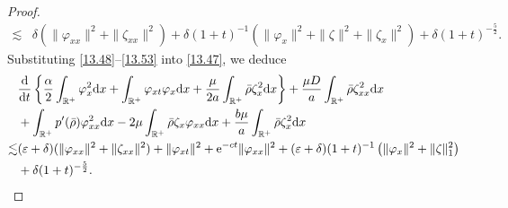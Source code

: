 \documentclass[11pt]{article}
\theoremstyle{plain}
\numberwithin{equation}{section}
\begin{document}
\begin{proof}
\begin{align}
			\lesssim&\delta(\|\varphi_{xx}\|^2+\|\zeta_{xx}\|^2)+\delta(1+t)^{-1}\left(\|\varphi_x\|^2+\|\zeta\|^2+\|\zeta_x\|^2\right)+\delta (1+t)^{-\frac{5}{2}}.
		\end{align}
	Substituting \eqref{13.48}--\eqref{13.53} into \eqref{13.47}, we deduce
\begin{align}\label{13.54}
			&\frac{{\rm d}}{{\rm d}t}\left\{\frac{\alpha}{2}\int_{\mathbb{R}^+}\varphi_x^2{\rm d}x+\int_{\mathbb{R}^+}^{}\varphi_{xt}\varphi_x{\rm d}x+\frac{\mu}{2a}\int_{\mathbb{R}^+}^{}\bar\rho\zeta_x^2{\rm d}x\right\}+\frac{\mu D}{a}\int_{\mathbb{R}^+}^{}\bar\rho\zeta_{xx}^2{\rm d}x	\notag\\
			&+\int_{\mathbb{R}^+}^{}p^{\prime}(\bar\rho)\varphi_{xx}^2{\rm d}x-2\mu\int_{\mathbb{R}^+}^{}\bar\rho\zeta_x\varphi_{xx}{\rm d}x+\frac{b\mu}{a}\int_{\mathbb{R}^+}^{}\bar\rho\zeta_x^2{\rm d}x\notag\\
			\lesssim&(\varepsilon+\delta)(\|\varphi_{xx}\|^2+\|\zeta_{xx}\|^2)+\|\varphi_{xt}\|^2+{\rm e}^{-ct}\|\varphi_{xx}\|^2+(\varepsilon+\delta)(1+t)^{-1}\left(\|\varphi_x\|^2+\|\zeta\|_1^2\right)\notag\\
			&+\delta (1+t)^{-\frac{5}{2}}.
		\end{align}


\end{proof}
\end{document}
